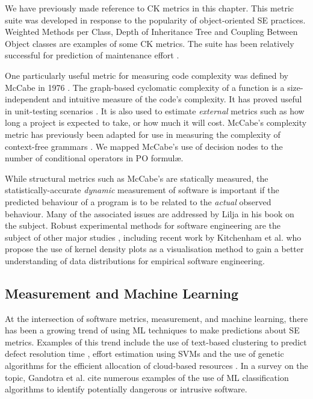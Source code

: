 We have previously made reference to CK metrics in this chapter. This metric suite was developed in response to the popularity of object-oriented SE practices. Weighted Methods per Class, Depth of Inheritance Tree and Coupling Between Object classes are examples of some CK metrics. The suite has been relatively successful for prediction of maintenance effort \cite{LiHenry}. 

One particularly useful metric for measuring code complexity was defined by McCabe in 1976 \cite{McCabe}. The graph-based cyclomatic complexity of a function is a size-independent and intuitive measure of the code's complexity. It has proved useful in unit-testing scenarios \cite{McCabeTesting}. It is also used to estimate \textit{external} metrics such as how long a project is expected to take, or how much it will cost.  McCabe's complexity metric has previously been adapted for use in measuring the complexity of context-free grammars \cite{nuimeprn6458}. We mapped McCabe's use of decision nodes to the number of conditional operators in \why PO formul\ae.

While structural metrics such as McCabe's are statically measured, the statistically-accurate \textit{dynamic} measurement of software is important if the predicted behaviour of a program is to be related to the \textit{actual} observed behaviour. Many of the associated issues are addressed by Lilja \cite{LiljaJ} in his book on the subject. Robust experimental methods for software engineering are the subject of other major studies \cite{AdvancedESE}, including recent work by Kitchenham et al. \cite{Kitchenham2016} who propose the use of kernel density plots as a visualisation method to gain a better understanding of data distributions for empirical software engineering.

\subsection{Measurement and Machine Learning}
\label{sub:lrmmml}

At the intersection of software metrics, measurement, and machine learning, there has been a growing trend of using ML techniques to make predictions about SE metrics. Examples of this trend include the use of text-based clustering to predict defect resolution time \cite{Assar2016}, effort estimation using SVMs \cite{Song:2014:PBR:2639490.2639510} and the use of genetic algorithms for the efficient allocation of cloud-based resources \cite{cloudML}. In a survey on the topic, Gandotra et al. \cite{ClassificationSurvey} cite numerous examples of the use of ML classification algorithms to identify potentially dangerous or intrusive software. 

